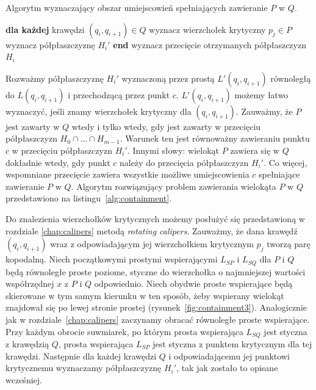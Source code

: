 \begin{algorithm}[b]
  \caption{\label{alg:containment} Algorytm wyznaczający obszar
    umiejscowień spełniających zawieranie $P$ w $Q$.}
\begin{algorithmic}[1]

\State \textbf{dla każdej} krawędzi $(q_i, q_{i+1}) \in Q$
\State \hspace{\algorithmicindent} wyznacz wierzchołek krytyczny $p_j \in P$
\State \hspace{\algorithmicindent} wyznacz półpłaszczyznę $H_i'$
\State \textbf{end}
\State wyznacz przecięcie otrzymanych półpłaszczyzn $H_i$

\EndProcedure
\end{algorithmic}
\end{algorithm}

Rozważmy półpłaszczyznę $H_i'$ wyznaczoną przez prostą
$L'(q_i,q_{i+1})$ równoległą do $L(q_i, q_{i+1})$ i przechodzącą przez
punkt $c$. $L'(q_i,q_{i+1})$ możemy łatwo wyznaczyć, jeśli znamy
wierzchołek krytyczny dla $(q_i, q_{i+1})$. Zauważmy, że $P$ jest
zawarty w $Q$ wtedy i tylko wtedy, gdy jest zawarty w przecięciu
półpłaszczyzn $H_0 \cap \ldots \cap H_{m-1}$. Warunek ten jest
równoważny zawieraniu punktu $c$ w przecięciu półpłaszczyzn
$H_i'$. Innymi słowy: wielokąt $P$ zawiera się w $Q$ dokładnie wtedy,
gdy punkt $c$ należy do przecięcia półpłaszczyzn $H_i'$. Co więcej,
wspomniane przecięcie zawiera wszystkie możliwe umiejscowienia $c$
spełniające zawieranie $P$ w $Q$. Algorytm rozwiązujący problem
zawierania wielokąta $P$ w $Q$ przedstawiono na
listingu~\ref{alg:containment}.



Do znalezienia wierzchołków krytycznych możemy posłużyć się
przedstawioną w rozdziale \ref{chap:calipers} metodą \emph{rotating
  calipers}. Zauważmy, że dana krawędź $(q_i, q_{i+1})$ wraz z
odpowiadającym jej wierzchołkiem krytycznym $p_j$ tworzą parę
kopodalną. Niech początkowymi prostymi wspierającymi $L_{SP}$ i
$L_{SQ}$ dla $P$ i $Q$ będą równoległe proste poziome, styczne do
wierzchołka o najmniejszej wartości współrzędnej $x$ z $P$ i $Q$
odpowiednio. Niech obydwie proste wspierające będą skierowane w tym
samym kierunku w ten sposób, żeby wspierany wielokąt znajdował się po
lewej stronie prostej (rysunek~\ref{fig:containment3}). Analogicznie
jak w rozdziale~\ref{chap:calipers} zaczynamy obracać równoległe
proste wspierające. Przy każdym obrocie suwmiarek, po którym prosta
wspierająca $L_{SQ}$ jest styczna z krawędzią $Q$, prosta wspierająca
$L_{SP}$ jest styczna z punktem krytycznym dla tej krawędzi. Następnie
dla każdej krawędzi $Q$ i odpowiadającemu jej punktowi krytycznemu
wyznaczamy półpłaszczyznę $H_i'$, tak jak zostało to opisane
wcześniej.

